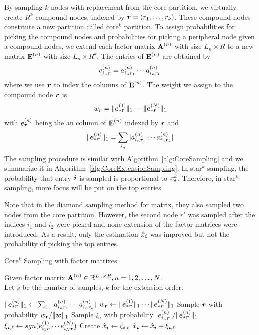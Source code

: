 \documentclass[letterpaper]{article}
\newcommand{\Sca}[3]{{#1}^{(#2)}_{i_#2#3}}%
\newcommand{\anr}[2]{\Sca{a}{#1}{#2}}
\newcommand{\enr}[2]{\Sca{e}{#1}{\V{#2}}}
\newcommand{\score}[1]{\xi_{\V{i},#1}}
\newcommand{\V}[1]{{\boldsymbol{{\MakeLowercase{#1}}}}}
\newcommand{\ColVec}[3]{\V{#1}^{(#2)}_{#3}}
\newcommand{\NormColE}[2]{\norm{\ColVec{e}{#1}{*\V{#2}}}{1}}
\newcommand{\coord}{(i_1,i_2,\ldots,i_N)}
\newcommand{\predx}{\hat{x}_{\V{i}}}
\newcommand{\M}[1]{{\textbf{{\MakeUppercase{#1}}}}}
\newcommand{\FacMat}[2]{\M{#1}^{(#2)}}
\newcommand{\norm}[2]{\|#1\|_{#2}}
\newcommand{\Alg}[1]{Algorithm~\ref{alg:#1}}
\begin{document}
By sampling $k$ nodes with replacement from the core partition, we virtually create $R^k$ compound nodes, indexed by $\V{r}=(r_1,\ldots,r_k)$. These compound nodes constitute a new partition called core$^k$ partition. To assign probabilities for picking the compound nodes and probabilities for picking a peripheral node given a compound nodes, we extend each factor matrix $\FacMat{A}{n}$ with size $L_n\times R$ to a new matrix $\M{E}^{(n)}$ with size $L_n\times R^k$. The entries of $\M{E}^{(n)}$ are obtained by
\begin{align}
\enr{n}{r} = \anr{n}{r_1}\cdots\anr{n}{r_k}
\end{align}
where we use $\V{r}$ to index the columns of $\M{E}^{(n)}$. The weight we assign to the compound node $\V{r}$ is
\begin{align}
w_{\V{r}} = \NormColE{1}{r}\cdots\NormColE{N}{r}
\end{align}
with $\V{e}_{\V{r}}^{(n)}$ being the an column of $\M{E}^{(n)}$ indexed by $\V{r}$ and
\begin{align}
\NormColE{n}{r} = \sum_{i_n}|\anr{n}{r_1}\cdots\anr{n}{r_k}|
\end{align}
The sampling procedure is similar with \Alg{CoreSampling} 
and we summarize it in \Alg{CoreExtensionSampling}. 
In star$^k$ sampling, 
the probability that entry $\V{i}$ is sampled is proportional to $x_{\V{i}}^k$. 
Therefore, in star$^k$ sampling, more focus will be put on the top entries.

Note that in the diamond sampling method for matrix, 
they also sampled two nodes from the core partition. 
However, the second node $r'$ was sampled after the indices $i_1$ and $i_2$ were picked 
and none extension of the factor matrices were introduced. 
As a result, only the estimation $\predx$ was improved 
but not the probability of picking the top entries.

\begin{algorithm}[]
    \caption{Core$^k$ Sampling with factor matrixes}
    \label{alg:CoreExtensionSampling}
    Given factor matrix $\FacMat{A}{n}\in \mathbb{R}^{L_n\times R}, n = 1,2,\ldots,N$.\\
    Let $s$ be the number of samples, $k$ for the extension order.
    \begin{algorithmic}[1]
    \For{$\V{r}\in{\underbrace{R\times \cdots \times R}_{k}}$}
    \State $\NormColE{n}{r} \leftarrow \sum_{i_n}|\anr{n}{r_1}\cdots\anr{n}{r_k}|$
    \EndFor
    \State $w_{\V{r}} \leftarrow \NormColE{1}{r} \cdots \NormColE{N}{r} $
    \EndFor
    \State Sample $\V{r}$ with probability $w_\V{r}/\norm{\V{W}}{1}$
    \label{line:nodes}
    \State Sample $i_n$ with probability $|\enr{n}{r}|/\NormColE{n}{r}$
    \EndFor
    \State
        $\score{\ell} \leftarrow sgn(\enr{1}{r}\cdots\enr{N}{r})$
    \If {$\V{i}=\coord$ has not been sampled}
    \State  Create $\predx \leftarrow \score{\ell} $
    \Else
    \State $\predx \leftarrow \predx + \score{\ell}$
    \EndIf
    \EndFor
    \end{algorithmic}
\end{algorithm}
\end{document}
